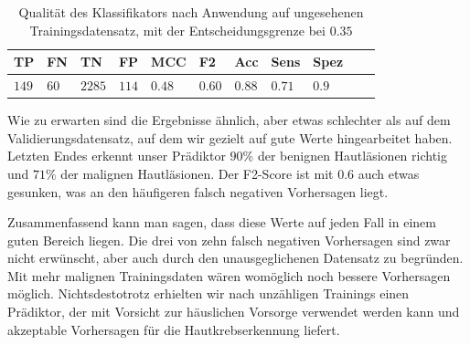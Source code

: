 \begin{table}[htb!]
\begin{center}
\begin{tabular}{lllllllllll}
	\toprule
 	TP & FN & TN & FP & MCC & F2 & Acc & Sens & Spez\\
	\midrule
    $149$&	$60$ &	$2285$ &	$114$ &	$0.48$ 	&$0.60$	&$0.88$	&$0.71$&	$0.9$ \\
 \bottomrule
 \end{tabular}
 \end{center}
  \caption{Qualität des Klassifikators nach Anwendung auf ungesehenen Trainingsdatensatz, mit der Entscheidungsgrenze bei $0.35$}
 \label{tab:test_scores}
 \end{table}

 Wie zu erwarten sind die Ergebnisse ähnlich, aber etwas schlechter als auf dem Validierungsdatensatz, auf dem wir gezielt auf gute Werte hingearbeitet haben. Letzten Endes erkennt unser Prädiktor $90\%$ der benignen Hautläsionen richtig und $71\%$ der malignen Hautläsionen. Der F2-Score ist mit $0.6$ auch etwas gesunken, was an den häufigeren falsch negativen Vorhersagen liegt.

Zusammenfassend kann man sagen, dass diese Werte auf jeden Fall in einem guten Bereich liegen. Die drei von zehn falsch negativen Vorhersagen sind zwar nicht erwünscht, aber auch durch den unausgeglichenen Datensatz zu begründen. Mit mehr malignen Trainingsdaten wären womöglich noch bessere Vorhersagen möglich. Nichtsdestotrotz erhielten wir nach unzähligen Trainings einen Prädiktor, der mit Vorsicht zur häuslichen Vorsorge verwendet werden kann und akzeptable Vorhersagen für die Hautkrebserkennung liefert.


